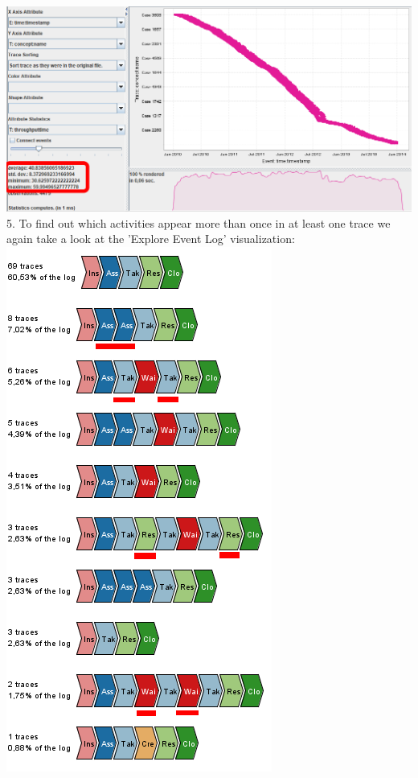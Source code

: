 \documentclass[../../main.tex]{subfiles}
\begin{document}
\includegraphics[width=\columnwidth]{img/ProM_c_trace_durations.png}\\
5. To find out which activities appear more than once in at least one trace we again take a look at the 'Explore Event Log' visualization:\\
\includegraphics[width=0.5\columnwidth]{img/ProM_c_traces_1.png}
\end{document}
